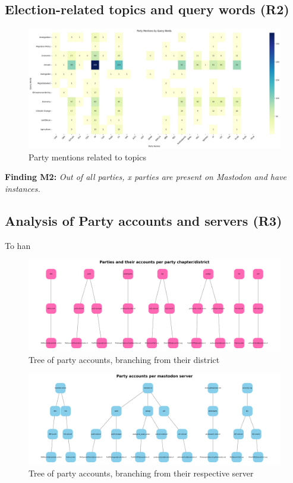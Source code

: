 \subsection{Election-related topics and query words (R2)}

\begin{figure}[ht]
  \centering
  \includegraphics[width=\linewidth]{media/party-mentions-topics.jpeg}
  \caption{Party mentions related to topics}
  \label{fig:topic}
\end{figure}


\textbf{Finding M2:} \textit{Out of all parties, x parties are present on Mastodon and have instances.}

\subsection{Analysis of Party accounts and servers (R3)}
To han

\begin{figure}[ht]
  \centering
  \includegraphics[width=\linewidth]{media/chapter.png}
  \caption{Tree of party accounts, branching from their district}
  \label{fig:partynetwork}
\end{figure}

\begin{figure}[ht]
  \centering
  \includegraphics[width=\linewidth]{media/server.png}
  \caption{Tree of party accounts, branching from their respective server}
  \label{fig:servernetwork}
\end{figure}

